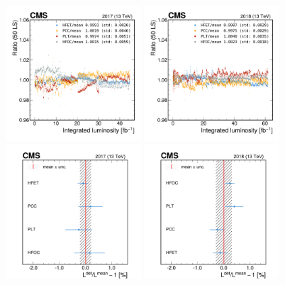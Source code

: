 \begin{figure}[!ht]
\centering
\includegraphics[width=0.45\textwidth]{figures/luminosity_integration_and_uncertainty/ratio__hfet-pcc-plt-hfocdivmean_PCConly_17.pdf}
\hspace*{0.05\textwidth}
\includegraphics[width=0.45\textwidth]{figures/luminosity_integration_and_uncertainty/ratio__hfet-pcc-plt-hfocdivmean_PCConly_18.pdf}
\includegraphics[width=0.45\textwidth]{figures/luminosity_integration_and_uncertainty/means_clean__hfet-pcc-plt-hfocdivmean_PCConly_17.pdf}
\hspace*{0.05\textwidth}
\includegraphics[width=0.45\textwidth]{figures/luminosity_integration_and_uncertainty/means_clean__hfet-pcc-plt-hfocdivmean_PCConly_18.pdf}

\end{figure}
